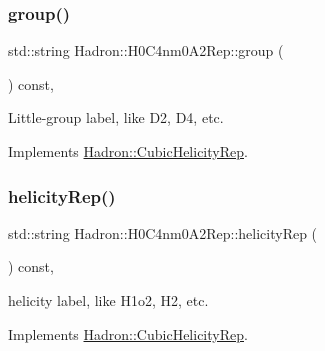 \mbox{\label{structHadron_1_1H0C4nm0A2Rep_aef42f0970df5b016741ddfeccf659871}} 
\subsubsection{\texorpdfstring{group()}{group()}\hspace{0.1cm}{\footnotesize\ttfamily [5/5]}}
{\footnotesize\ttfamily std\+::string Hadron\+::\+H0\+C4nm0\+A2\+Rep\+::group (\begin{DoxyParamCaption}{ }\end{DoxyParamCaption}) const\hspace{0.3cm}{\ttfamily [inline]}, {\ttfamily [virtual]}}

Little-\/group label, like D2, D4, etc. 

Implements \mbox{\hyperlink{structHadron_1_1CubicHelicityRep_a101a7d76cd8ccdad0f272db44b766113}{Hadron\+::\+Cubic\+Helicity\+Rep}}.

\mbox{\label{structHadron_1_1H0C4nm0A2Rep_a59dd3bff36461e4696319223e7f03082}} 
\subsubsection{\texorpdfstring{helicityRep()}{helicityRep()}\hspace{0.1cm}{\footnotesize\ttfamily [1/3]}}
{\footnotesize\ttfamily std\+::string Hadron\+::\+H0\+C4nm0\+A2\+Rep\+::helicity\+Rep (\begin{DoxyParamCaption}{ }\end{DoxyParamCaption}) const\hspace{0.3cm}{\ttfamily [inline]}, {\ttfamily [virtual]}}

helicity label, like H1o2, H2, etc. 

Implements \mbox{\hyperlink{structHadron_1_1CubicHelicityRep_af1096946b7470edf0a55451cc662f231}{Hadron\+::\+Cubic\+Helicity\+Rep}}.

\mbox{\label{structHadron_1_1H0C4nm0A2Rep_a59dd3bff36461e4696319223e7f03082}} 
